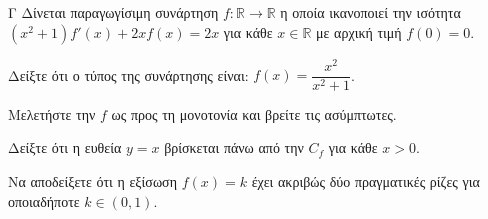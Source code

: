 \begin{thema}{Γ}
Δίνεται παραγωγίσιμη συνάρτηση $f : \mathbb{R} \to \mathbb{R}$ η οποία ικανοποιεί την ισότητα $(x^2+1) f'(x) + 2x f(x) = 2x$ για κάθε $x\in\mathbb{R}$  με αρχική τιμή $f(0) = 0$.
\begin{erwthma}
  \item Δείξτε ότι ο τύπος της συνάρτησης είναι: $f(x) = \dfrac{x^2}{x^2+1}$.
  \item Μελετήστε την $f$ ως προς τη μονοτονία και βρείτε τις ασύμπτωτες.
  \item Δείξτε ότι η ευθεία $y=x$ βρίσκεται πάνω από την $C_f$ για κάθε $x>0$.
  \item Να αποδείξετε ότι η εξίσωση $f(x) = k$ έχει ακριβώς δύο πραγματικές ρίζες για οποιαδήποτε $k \in (0, 1)$.
\end{erwthma}
\end{thema}
